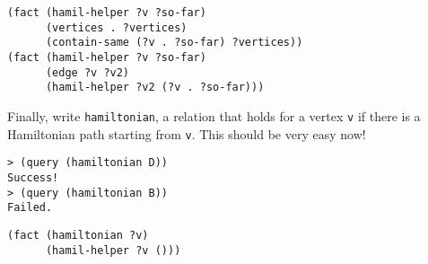 \begin{questions}
\begin{solution}[2in]
\begin{lstlisting}
(fact (hamil-helper ?v ?so-far)
      (vertices . ?vertices)
      (contain-same (?v . ?so-far) ?vertices))
(fact (hamil-helper ?v ?so-far)
      (edge ?v ?v2)
      (hamil-helper ?v2 (?v . ?so-far)))
\end{lstlisting}
\end{solution}

\question
Finally, write {\tt hamiltonian}, a relation that holds for a vertex {\tt v} if
there is a Hamiltonian path starting from {\tt v}. This should be very easy now!

\begin{lstlisting}
> (query (hamiltonian D))
Success!
> (query (hamiltonian B))
Failed.
\end{lstlisting}

\begin{solution}[0.5in]
\begin{lstlisting}
(fact (hamiltonian ?v)
      (hamil-helper ?v ()))
\end{lstlisting}
\end{solution}

\end{questions}

